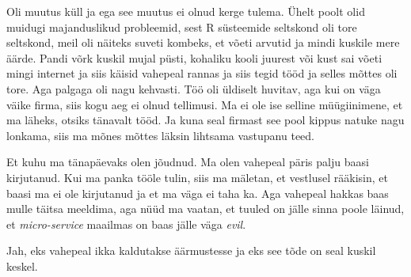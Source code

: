 
Oli muutus küll ja ega see muutus ei olnud kerge tulema. Ühelt poolt olid  
muidugi majanduslikud probleemid, sest R süsteemide seltskond oli tore 
seltskond, meil oli näiteks suveti kombeks, et võeti arvutid ja mindi kuskile 
mere äärde. Pandi võrk kuskil mujal püsti, kohaliku kooli juurest  või kust sai 
võeti mingi internet ja siis käisid vahepeal rannas ja siis tegid tööd ja 
selles mõttes oli tore. Aga palgaga oli nagu kehvasti. Töö oli üldiselt 
huvitav, aga kui on väga väike firma, siis kogu aeg ei olnud tellimusi. Ma ei 
ole ise selline müügiinimene, et ma läheks, otsiks tänavalt tööd. Ja kuna seal 
firmast see pool kippus natuke nagu lonkama, siis ma mõnes mõttes läksin 
lihtsama vastupanu teed. 

Et kuhu ma tänapäevaks olen jõudnud. Ma olen vahepeal päris palju baasi 
kirjutanud. Kui ma panka tööle tulin, siis ma mäletan, et vestlusel rääkisin, 
et baasi ma ei ole kirjutanud ja et ma väga ei taha ka. Aga vahepeal hakkas 
baas mulle  täitsa meeldima, aga nüüd ma vaatan, et tuuled on jälle sinna poole 
läinud, et \emph{micro-service} maailmas on baas jälle väga \emph{evil}. 


Jah, eks vahepeal ikka kaldutakse äärmustesse ja eks see tõde on seal kuskil 
keskel.
